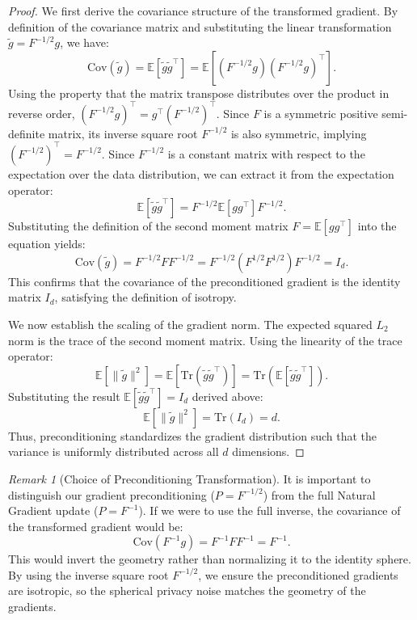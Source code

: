 \documentclass{article}
\theoremstyle{plain}
\theoremstyle{definition}
\theoremstyle{remark}
\newtheorem{remark}[theorem]{Remark}
\begin{document}
\begin{proof}
We first derive the covariance structure of the transformed gradient. By definition of the covariance matrix and substituting the linear transformation $\tilde{g} = F^{-1/2} g$, we have:
\begin{equation}
    \text{Cov}(\tilde{g}) = \mathbb{E}[\tilde{g} \tilde{g}^\top] = \mathbb{E}\left[ (F^{-1/2} g) (F^{-1/2} g)^\top \right].
\end{equation}
Using the property that the matrix transpose distributes over the product in reverse order, $(F^{-1/2} g)^\top = g^\top (F^{-1/2})^\top$. Since $F$ is a symmetric positive semi-definite matrix, its inverse square root $F^{-1/2}$ is also symmetric, implying $(F^{-1/2})^\top = F^{-1/2}$. Since $F^{-1/2}$ is a constant matrix with respect to the expectation over the data distribution, we can extract it from the expectation operator:
\begin{equation}
    \mathbb{E}[\tilde{g} \tilde{g}^\top] = F^{-1/2} \mathbb{E}[g g^\top] F^{-1/2}.
\end{equation}
Substituting the definition of the second moment matrix $F = \mathbb{E}[g g^\top]$ into the equation yields:
\begin{equation}
    \text{Cov}(\tilde{g}) = F^{-1/2} F F^{-1/2} = F^{-1/2} (F^{1/2} F^{1/2}) F^{-1/2} = I_d.
\end{equation}
This confirms that the covariance of the preconditioned gradient is the identity matrix $I_d$, satisfying the definition of isotropy.

We now establish the scaling of the gradient norm. The expected squared $L_2$ norm is the trace of the second moment matrix. Using the linearity of the trace operator:
\begin{equation}
    \mathbb{E}[\|\tilde{g}\|^2] = \mathbb{E}[\text{Tr}(\tilde{g} \tilde{g}^\top)] = \text{Tr}(\mathbb{E}[\tilde{g} \tilde{g}^\top]).
\end{equation}
Substituting the result $\mathbb{E}[\tilde{g} \tilde{g}^\top] = I_d$ derived above:
\begin{equation}
    \mathbb{E}[\|\tilde{g}\|^2] = \text{Tr}(I_d) = d.
\end{equation}
Thus, preconditioning standardizes the gradient distribution such that the variance is uniformly distributed across all $d$ dimensions.
\end{proof}

\begin{remark}[Choice of Preconditioning Transformation]
It is important to distinguish our gradient preconditioning ($P=F^{-1/2}$) from the full Natural Gradient update ($P=F^{-1}$). If we were to use the full inverse, the covariance of the transformed gradient would be:
\begin{equation}
    \text{Cov}(F^{-1}g) = F^{-1} F F^{-1} = F^{-1}.
\end{equation}
This would invert the geometry rather than normalizing it to the identity sphere. By using the inverse square root $F^{-1/2}$, we ensure the preconditioned gradients are isotropic, so the spherical privacy noise matches the geometry of the gradients.
\end{remark}
\end{document}
